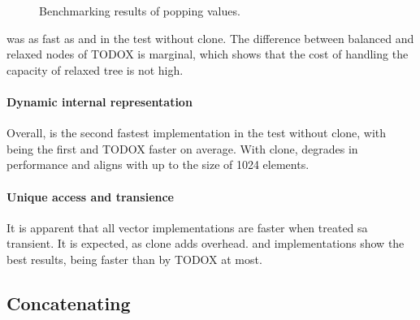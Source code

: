 \begin{figure}[!htbp]
    \caption{Benchmarking results of popping values.}
    \label{fig:pop}
\end{figure}

\imrsvec{} was as fast as \rbvec{} and \rrbvec{} in the test without clone. The difference between balanced and relaxed nodes of TODOX is marginal, which shows that the cost of handling the capacity of relaxed tree is not high. 

\paragraph{Dynamic internal representation}
Overall, \pvec{} is the second fastest implementation in the test without clone, with \stdvec{} being the first and TODOX faster on average. With clone, \pvec{} degrades in performance and aligns with \stdvec{} up to the size of 1024 elements. 

\paragraph{Unique access and transience}
It is apparent that all vector implementations are faster when treated sa transient. It is expected, as clone adds overhead. \rbvec{} and \rrbvec{} implementations show the best results, being faster than \stdvec{} by TODOX at most. 

\subsection{Concatenating}

